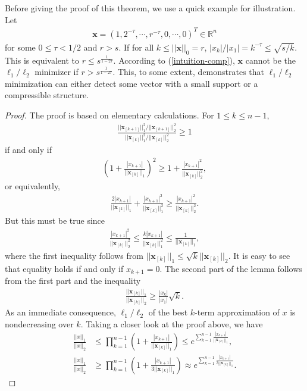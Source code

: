 \documentclass[11pt]{article}
\numberwithin{equation}{section}
\theoremstyle{plain}
\theoremstyle{definition}
\def\R{{\mathbb R}}
\def\R{{\mathbb R}}
\def\x{{\mathbf x}}
\begin{document}
Before giving the proof of this theorem, we use a quick example for illustration. Let \begin{align*}
\x=(1, 2^{-\tau}, \cdots, r^{-\tau}, 0, \cdots, 0)^T\in\R^n
\end{align*}
for some $0\leq\tau<1/2$ and $r>s$. If for all $k\leq ||\x||_0=r$, $|x_k|/|x_1|=k^{-\tau}\leq\sqrt{s/k}$. This is equivalent to $r\leq s^{\frac{1}{1-2\tau}}$. According to (\ref{intuition-comp}), $\x$ cannot be the $\ell_1/\ell_2$ minimizer if $r>s^{\frac{1}{1-2\tau}}$. This, to some extent, demonstrates that $\ell_1/\ell_2$ minimization can either detect some vector with a small support or a compressible structure.  
\begin{proof}
The proof is based on elementary calculations. For $1\leq k\leq n-1$, 
\begin{align*}
\frac{||\x_{[k+1]}||^2_1/||\x_{[k+1]}||^2_2}{||\x_{[k]}||^2_1/||\x_{[k]}||^2_2}\geq 1
\end{align*}
if and only if
\begin{align*}
\left(1+\frac{|x_{k+1}|}{||\x_{[k]}||_1}\right)^2\geq 1+\frac{|x_{k+1}|^2}{||\x_{[k]}||_2^2},
\end{align*}
or equivalently, 
\begin{align*}
\frac{2|x_{k+1}|}{||\x_{[k]}||_1}+\frac{|x_{k+1}|^2}{||\x_{[k]}||^2_1}\geq\frac{|x_{k+1}|^2}{||\x_{[k]}||_2^2}.
\end{align*}
But this must be true since
\begin{align*}
\frac{|x_{k+1}|^2}{||\x_{[k]}||_2^2}\leq\frac{k|x_{k+1}|}{||\x_{[k]}||_1^2}\leq\frac{1}{||\x_{[k]}||_1}, 
\end{align*}
where the first inequality follows from $||\x_{[k]}||_1\leq\sqrt{k}||\x_{[k]}||_2$. It is easy to see that equality holds if and only if $x_{k+1}=0$. The second part of the lemma follows from the first part and the inequality
\begin{align*}
\frac{||\x_{[k]}||_1}{||\x_{[k]}||_2}\geq\frac{|x_k|}{|x_1|}\sqrt{k}.
\end{align*}
As an immediate consequence, $\ell_1/\ell_2$ of the best $k$-term approximation of $x$ is nondecreasing over $k$. Taking a closer look at the proof above, we have 
\begin{align*}
\frac{||x||_1}{||x||_2}&\leq\prod_{k=1}^{n-1}\left(1+\frac{|x_{k+1}|}{||\x_{[k]}||_1}\right)\leq e^{\sum_{k=1}^{n-1}\frac{|x_{k+1}|}{||\x_{[k]}||_1}},\\
\frac{||x||_1}{||x||_2}&\geq\prod_{k=1}^{n-1}\left(1+\frac{|x_{k+1}|}{3||\x_{[k]}||_1}\right)\approx e^{\sum_{k=1}^{n-1}\frac{|x_{k+1}|}{3||\x_{[k]}||_1}}.
\end{align*}
\end{proof}
\end{document}
